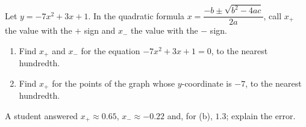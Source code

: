 Let $y=-7x^2+3x+1$. In the quadratic formula $x=\dfrac{-b\pm\sqrt{b^2-4ac}}{2a}$, call $x_+$ the value with the $+$ sign and $x_-$ the value with the $-$ sign.
\begin{enumerate}
\item[(a)] Find $x_+$ and $x_-$ for the equation $-7x^2+3x+1=0$, to the nearest hundredth.
\item[(b)] Find $x_+$ for the points of the graph whose $y$-coordinate is $-7$, to the nearest hundredth.
\end{enumerate}
A student answered $x_+\approx0.65$, $x_-\approx-0.22$ and, for (b), $1.3$; explain the error.

